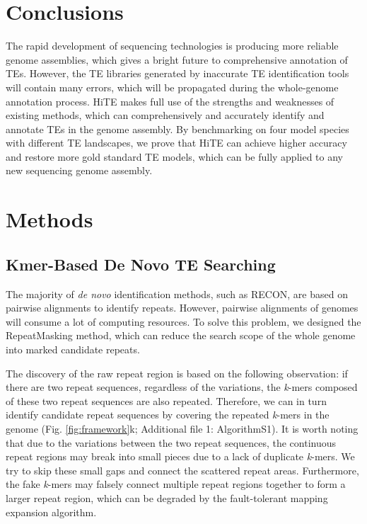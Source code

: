 \documentclass{bmcart}
\begin{document}
\section*{Conclusions}
The rapid development of sequencing technologies is producing more reliable genome assemblies, which gives a bright future to comprehensive annotation of TEs. However, the TE libraries generated by inaccurate TE identification tools will contain many errors, which will be propagated during the whole-genome annotation process. HiTE makes full use of the strengths and weaknesses of existing methods, which can comprehensively and accurately identify and annotate TEs in the genome assembly. By benchmarking on four model species with different TE landscapes, we prove that HiTE can achieve higher accuracy and restore more gold standard TE models, which can be fully applied to any new sequencing genome assembly.

\section*{Methods}

\subsection*{Kmer-Based De Novo TE Searching}
The majority of \emph{de novo} identification methods, such as RECON, are based on pairwise alignments to identify repeats. However, pairwise alignments of genomes will consume a lot of computing resources. To solve this problem, we designed the RepeatMasking method, which can reduce the search scope of the whole genome into marked candidate repeats.

The discovery of the raw repeat region is based on the following observation: if there are two repeat sequences, regardless of the variations, the \emph{k}-mers composed of these two repeat sequences are also repeated. Therefore, we can in turn identify candidate repeat sequences by covering the repeated \emph{k}-mers in the genome (Fig. \ref{fig:framework}k; Additional file 1: AlgorithmS1). It is worth noting that due to the variations between the two repeat sequences, the continuous repeat regions may break into small pieces due to a lack of duplicate \emph{k}-mers. We try to skip these small gaps and connect the scattered repeat areas. Furthermore, the fake \emph{k}-mers may falsely connect multiple repeat regions together to form a larger repeat region, which can be degraded by the fault-tolerant mapping expansion algorithm.
\end{document}
